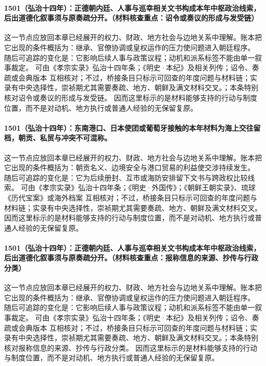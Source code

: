 \paragraph{1501（弘治十四年）：正德朝内廷、人事与巡幸相关文书构成本年中枢政治线索，后出道德化叙事须与原奏疏分开。（材料核查重点：诏令或奏议的形成与发受链）} 这一节点应放回本章已经展开的权力、财政、地方社会与边地关系中理解。账本把它出现的条件概括为：继承、官僚协调或皇权运作的压力使问题进入朝廷程序。 随后可追踪的变化是：它影响后续人事与政策议程；动机和派系标签不能由单一叙事裁定。 可由《孝宗实录》弘治十四年条；《明史·本纪》及相关列传；诏令、奏疏或会典版本 互相核对；不过，桥接条目只标示可回查的年度问题与材料链；实录有中央选择性，崇祯期尤其需要奏疏、地方、朝鲜及满文材料交叉。；本条特别核对诏令或奏议的形成与发受链。 因而这里标示的是材料能够支持的行动与制度位置，而不是对动机、地方执行或普通人经验的无保留复原。

\paragraph{1501（弘治十四年）：东南港口、日本使团或葡萄牙接触的本年材料为海上交往留档，朝贡、私贸与冲突不可混称。} 这一节点应放回本章已经展开的权力、财政、地方社会与边地关系中理解。账本把它出现的条件概括为：朝贡名义、边境安全与港口贸易的利益使交涉持续发生。 随后可追踪的变化是：它为后续册封、互市或海防安排留下文书与跨政权比较线索。 可由《孝宗实录》弘治十四年条；《明史·外国传》；《朝鲜王朝实录》、琉球《历代宝案》或海外档案 互相核对；不过，桥接条目只标示可回查的年度问题与材料链；实录有中央选择性，崇祯期尤其需要奏疏、地方、朝鲜及满文材料交叉。 因而这里标示的是材料能够支持的行动与制度位置，而不是对动机、地方执行或普通人经验的无保留复原。

\paragraph{1501（弘治十四年）：正德朝内廷、人事与巡幸相关文书构成本年中枢政治线索，后出道德化叙事须与原奏疏分开。（材料核查重点：报称信息的来源、抄传与行政分类）} 这一节点应放回本章已经展开的权力、财政、地方社会与边地关系中理解。账本把它出现的条件概括为：继承、官僚协调或皇权运作的压力使问题进入朝廷程序。 随后可追踪的变化是：它影响后续人事与政策议程；动机和派系标签不能由单一叙事裁定。 可由《孝宗实录》弘治十四年条；《明史·本纪》及相关列传；诏令、奏疏或会典版本 互相核对；不过，桥接条目只标示可回查的年度问题与材料链；实录有中央选择性，崇祯期尤其需要奏疏、地方、朝鲜及满文材料交叉。；本条特别核对报称信息的来源、抄传与行政分类。 因而这里标示的是材料能够支持的行动与制度位置，而不是对动机、地方执行或普通人经验的无保留复原。

